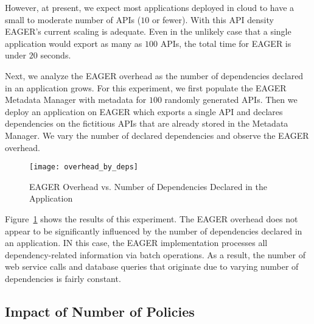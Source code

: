 However, at present, we expect 
most applications deployed in cloud to have a small to moderate number of 
APIs ($10$ or fewer).  With this API density EAGER's current scaling is
adequate.
Even in the
unlikely case that a single application would export as many as $100$ APIs,
the total time for EAGER is under $20$ seconds.


Next, we analyze the EAGER overhead as the number of dependencies declared in
an application grows. For this experiment, we first populate the EAGER
Metadata Manager with metadata for $100$ randomly generated APIs. Then we
deploy an application on EAGER which exports a single API and declares
dependencies on the fictitious 
APIs that are already stored in the Metadata Manager. We
vary the number of declared dependencies and observe the EAGER overhead.

\begin{figure}
\centering
\texttt{[image: overhead\_by\_deps]}
\caption{EAGER Overhead vs. Number of Dependencies Declared in the Application}
\label{fig:overhead_by_deps}
\end{figure}

Figure~\ref{fig:overhead_by_deps} shows the results of this experiment. 
The EAGER overhead does not appear to be significantly
influenced by the number of dependencies declared in an application. 
IN this case, the EAGER implementation processes
all dependency-related information via batch operations. 
As a result, the number of web service calls and database queries that originate due to varying number of dependencies
is fairly constant. 

\subsection{Impact of Number of Policies}

